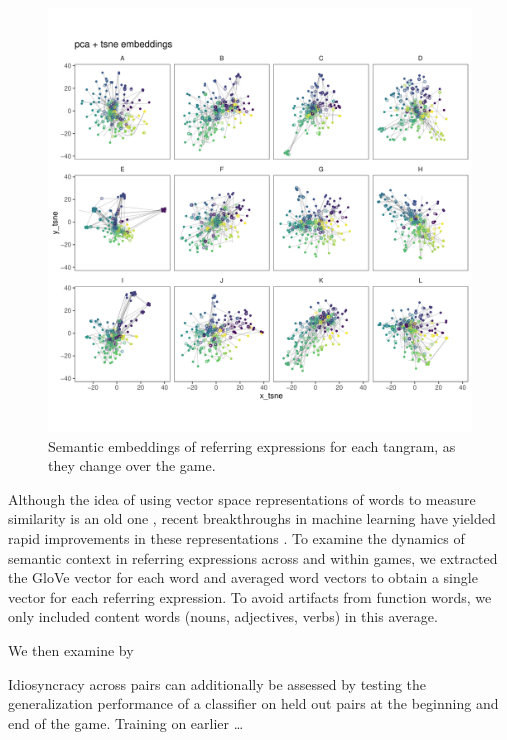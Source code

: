 \documentclass[alpha-refs]{wiley-article}
\begin{document}
\begin{figure}[t]
\centering
\includegraphics[scale=.3]{tsne_embeddings.pdf}
\caption{Semantic embeddings of referring expressions for each tangram, as they change over the game. }
\label{fig:tsne}
\end{figure}

Although the idea of using vector space representations of words to measure similarity is an old one \cite{XXX}, recent breakthroughs in machine learning have yielded rapid improvements in these representations \cite{XXX}.
To examine the dynamics of semantic context in referring expressions across and within games, we extracted the GloVe vector for each word \cite{} and averaged word vectors to obtain a single vector for each referring expression.
To avoid artifacts from function words, we only included content words (nouns, adjectives, verbs) in this average.

We then examine by 

Idiosyncracy across pairs can additionally be assessed by testing the generalization performance of a classifier on held out pairs at the beginning and end of the game. Training on earlier \dots
\end{document}
